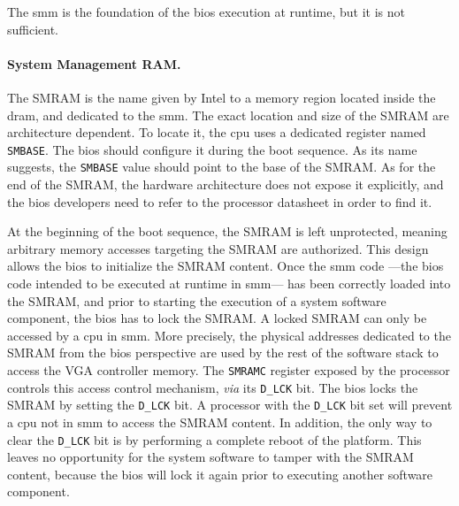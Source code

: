 The \ac{smm} is the foundation of the \ac{bios} execution at runtime, but it is
not sufficient.  

\paragraph{System Management RAM.}
%
The SMRAM is the name given by Intel to a memory region located inside the
\ac{dram}, and dedicated to the \ac{smm}.
%
The exact location and size of the SMRAM are architecture dependent.
%
To locate it, the \ac{cpu} uses a dedicated register named \texttt{SMBASE}.
%
The \ac{bios} should configure it during the boot sequence.
%
As its name suggests, the \texttt{SMBASE} value should point to the base of the
SMRAM.
%
As for the end of the SMRAM, the hardware architecture does not expose it
explicitly, and the \ac{bios} developers need to refer to the processor
datasheet in order to find it.

At the beginning of the boot sequence, the SMRAM is left unprotected, meaning
arbitrary memory accesses targeting the SMRAM are authorized.
%
This design allows the \ac{bios} to initialize the SMRAM content.
%
Once the \ac{smm} code ---the \ac{bios} code intended to be executed at runtime
in \ac{smm}--- has been correctly loaded into the SMRAM, and prior to starting
the execution of a system software component, the \ac{bios} has to lock the
SMRAM.
%
A locked SMRAM can only be accessed by a \ac{cpu} in \ac{smm}.
%
More precisely, the physical addresses dedicated to the SMRAM from the \ac{bios}
perspective are used by the rest of the software stack to access the VGA
controller memory. 
%
The \texttt{SMRAMC} register exposed by the processor controls this access
control mechanism, \emph{via} its \texttt{D\_LCK} bit.
%
The \ac{bios} locks the SMRAM by setting the \texttt{D\_LCK} bit.
%
A processor with the \texttt{D\_LCK} bit set will prevent a \ac{cpu}  not in
\ac{smm} to access the SMRAM content.
%
In addition, the only way to clear the \texttt{D\_LCK} bit is by performing a
complete reboot of the platform.
%
This leaves no opportunity for the system software to tamper with the SMRAM
content, because the \ac{bios} will lock it again prior to executing another
software component.

